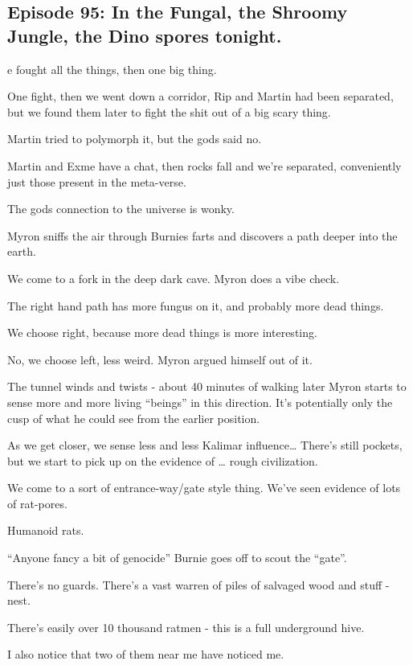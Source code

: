 \subsection{Episode 95: In the Fungal, the Shroomy Jungle, the Dino spores tonight.}

e fought all the things, then one big thing.\medskip

One fight, then we went down a corridor, Rip and Martin had been separated, but we found them later to fight the shit out of a big scary thing.\medskip

Martin tried to polymorph it, but the gods said no.\medskip

Martin and Exme have a chat, then rocks fall and we’re separated, conveniently just those present in the meta-verse.\medskip

The gods connection to the universe is wonky.\medskip

Myron sniffs the air through Burnies farts and discovers a path deeper into the earth.\medskip

We come to a fork in the deep dark cave. Myron does a vibe check.\medskip

The right hand path has more fungus on it, and probably more dead things.\medskip

We choose right, because more dead things is more interesting.\medskip

No, we choose left, less weird. Myron argued himself out of it.\medskip

The tunnel winds and twists - about 40 minutes of walking later Myron starts to sense more and more living “beings” in this direction. It’s potentially only the cusp of what he could see from the earlier position.\medskip

As we get closer, we sense less and less Kalimar influence… There’s still pockets, but we start to pick up on the evidence of … rough civilization.\medskip

We come to a sort of entrance-way/gate style thing. We’ve seen evidence of lots of rat-pores.\medskip

Humanoid rats.\medskip

“Anyone fancy a bit of genocide” Burnie goes off to scout the “gate”.\medskip

There’s no guards. There’s a vast warren of piles of salvaged wood and stuff - nest.\medskip

There’s easily over 10 thousand ratmen - this is a full underground hive.\medskip

I also notice that two of them near me have noticed me.\medskip

